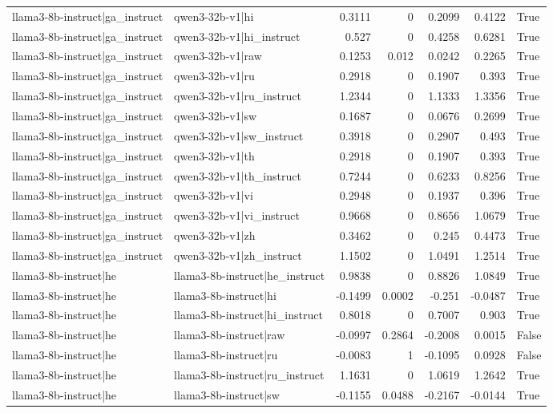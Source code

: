 \begin{table}
\begin{tabular}{l l r r r r l}
llama3-8b-instruct|ga_instruct & qwen3-32b-v1|hi & 0.3111 & 0 & 0.2099 & 0.4122 & True \\
llama3-8b-instruct|ga_instruct & qwen3-32b-v1|hi_instruct & 0.527 & 0 & 0.4258 & 0.6281 & True \\
llama3-8b-instruct|ga_instruct & qwen3-32b-v1|raw & 0.1253 & 0.012 & 0.0242 & 0.2265 & True \\
llama3-8b-instruct|ga_instruct & qwen3-32b-v1|ru & 0.2918 & 0 & 0.1907 & 0.393 & True \\
llama3-8b-instruct|ga_instruct & qwen3-32b-v1|ru_instruct & 1.2344 & 0 & 1.1333 & 1.3356 & True \\
llama3-8b-instruct|ga_instruct & qwen3-32b-v1|sw & 0.1687 & 0 & 0.0676 & 0.2699 & True \\
llama3-8b-instruct|ga_instruct & qwen3-32b-v1|sw_instruct & 0.3918 & 0 & 0.2907 & 0.493 & True \\
llama3-8b-instruct|ga_instruct & qwen3-32b-v1|th & 0.2918 & 0 & 0.1907 & 0.393 & True \\
llama3-8b-instruct|ga_instruct & qwen3-32b-v1|th_instruct & 0.7244 & 0 & 0.6233 & 0.8256 & True \\
llama3-8b-instruct|ga_instruct & qwen3-32b-v1|vi & 0.2948 & 0 & 0.1937 & 0.396 & True \\
llama3-8b-instruct|ga_instruct & qwen3-32b-v1|vi_instruct & 0.9668 & 0 & 0.8656 & 1.0679 & True \\
llama3-8b-instruct|ga_instruct & qwen3-32b-v1|zh & 0.3462 & 0 & 0.245 & 0.4473 & True \\
llama3-8b-instruct|ga_instruct & qwen3-32b-v1|zh_instruct & 1.1502 & 0 & 1.0491 & 1.2514 & True \\
llama3-8b-instruct|he & llama3-8b-instruct|he_instruct & 0.9838 & 0 & 0.8826 & 1.0849 & True \\
llama3-8b-instruct|he & llama3-8b-instruct|hi & -0.1499 & 0.0002 & -0.251 & -0.0487 & True \\
llama3-8b-instruct|he & llama3-8b-instruct|hi_instruct & 0.8018 & 0 & 0.7007 & 0.903 & True \\
llama3-8b-instruct|he & llama3-8b-instruct|raw & -0.0997 & 0.2864 & -0.2008 & 0.0015 & False \\
llama3-8b-instruct|he & llama3-8b-instruct|ru & -0.0083 & 1 & -0.1095 & 0.0928 & False \\
llama3-8b-instruct|he & llama3-8b-instruct|ru_instruct & 1.1631 & 0 & 1.0619 & 1.2642 & True \\
llama3-8b-instruct|he & llama3-8b-instruct|sw & -0.1155 & 0.0488 & -0.2167 & -0.0144 & True \\

\end{tabular}
\end{table}
